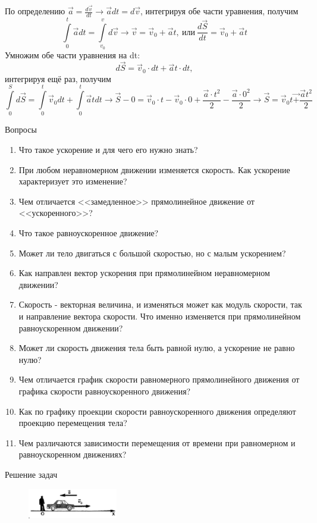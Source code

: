 \documentclass[a6paper, 11pt]{diss_4}
\renewcommand{\'}{\,'}
\begin{document}
По определению $\vec{a}=\frac{d\vec{v}}{dt}\to\vec{a}dt=d\vec{v}$,
интегрируя обе части уравнения, получим
\[\int\limits_{0}^{t}\vec{a}dt=\int\limits_{v_0}^{v}d\vec{v}\to\vec{v}=
\vec{v}_0+\vec{a}t,\ или\ \frac{d\vec{S}}{dt}=\vec{v}_0+\vec{a}t
\]
Умножим обе части уравнения на dt:
\[d\vec{S}=\vec{v}_0\cdot dt+\vec{a}t\cdot dt,\]
интегрируя ещё раз, получим
\[
\int\limits_{0}^{S}d\vec{S}=\int\limits_{0}^{t}\vec{v}_0dt+
\int\limits_{0}^{t}\vec{a}tdt\to\vec{S}-0=
\vec{v}_0\cdot t-\vec{v}_0\cdot 0+\frac{\vec{a}\cdot{t^2}}{2}-
\frac{\vec{a}\cdot{0^2}}{2}\to
\vec{S}=\vec{v}_0t\vec{+}\frac{\vec{a}t^2}{2}
\]

\begin{center}
   Вопросы
\end{center}
\begin{enumerate}
\item Что  такое  ускорение   и   для   чего  его нужно знать?
\item При любом неравномерном движении изменяется   скорость.   Как   ускорение   характеризует это изменение?
\item Чем   отличается   <<замедленное>>   прямолинейное    движение    от    <<ускоренного>>?
\item Что     такое     равноускоренное     движение?
\item Может ли  тело двигаться  с большой скоростью, но с малым ускорением?
\item Как направлен  вектор ускорения  при прямолинейном неравномерном движении?
\item Скорость - векторная величина, и изменяться может как модуль скорости, так и  направление вектора скорости. Что именно изменяется при прямолинейном  равноускоренном движении?
\item Может ли скорость движения  тела быть равной  нулю, а ускорение не равно нулю?
\item Чем отличается график скорости равномерного прямолинейного движения от графика скорости равноускоренного движения?
\item Как   по   графику   проекции   скорости равноускоренного      движения      определяют проекцию перемещения тела?
\item Чем различаются зависимости перемещения от времени при равномерном и равноускоренном движениях?
\end{enumerate}
\begin{center}
   Решение задач
\end{center}
\begin{figure}
\begin{center}
  \includegraphics[width=0.35\textwidth]{img/img15.eps}\\
\end{center}
  \caption{}\label{img1516}
\end{figure}
\end{document}
